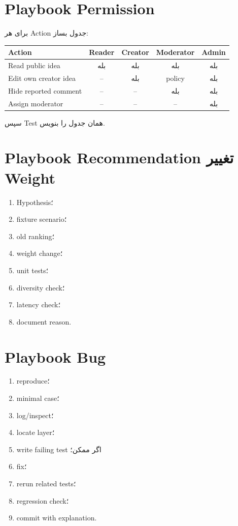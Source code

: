 \section{Playbook Permission}

برای هر Action جدول بساز:

\begin{longtable}{p{5cm}cccc}
\toprule
Action & Reader & Creator & Moderator & Admin \\
\midrule
Read public idea & بله & بله & بله & بله \\
Edit own creator idea & -- & بله & policy & بله \\
Hide reported comment & -- & -- & بله & بله \\
Assign moderator & -- & -- & -- & بله \\
\bottomrule
\end{longtable}

سپس Test همان جدول را بنویس.

\section{Playbook Recommendation تغییر Weight}

\begin{enumerate}
  \item Hypothesis؛
  \item fixture scenario؛
  \item old ranking؛
  \item weight change؛
  \item unit tests؛
  \item diversity check؛
  \item latency check؛
  \item document reason.
\end{enumerate}

\section{Playbook Bug}

\begin{enumerate}
  \item reproduce؛
  \item minimal case؛
  \item log/inspect؛
  \item locate layer؛
  \item write failing test اگر ممکن؛
  \item fix؛
  \item rerun related tests؛
  \item regression check؛
  \item commit with explanation.
\end{enumerate}

